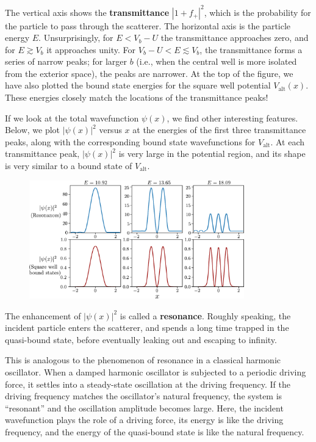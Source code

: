 \documentclass[pra,12pt]{revtex4}
\begin{document}
The vertical axis shows the \textbf{transmittance} $|1+f_+|^2$, which
is the probability for the particle to pass through the scatterer.
The horizontal axis is the particle energy $E$.  Unsurprisingly, for
$E < V_b-U$ the transmittance approaches zero, and for $E \gtrsim V_b$
it approaches unity.  For $V_b-U < E \lesssim V_b$, the transmittance
forms a series of narrow peaks; for larger $b$ (i.e., when the central
well is more isolated from the exterior space), the peaks are
narrower.  At the top of the figure, we have also plotted the bound
state energies for the square well potential $V_{\mathrm{alt}}(x)$.
These energies closely match the locations of the transmittance peaks!

If we look at the total wavefunction $\psi(x)$, we find other
interesting features.  Below, we plot $|\psi(x)|^2$ versus $x$ at the
energies of the first three transmittance peaks, along with the
corresponding bound state wavefunctions for $V_{\mathrm{alt}}$.  At
each transmittance peak, $|\psi(x)|^2$ is very large in the potential
region, and its shape is very similar to a bound state of
$V_{\mathrm{alt}}$.

\begin{figure}[h]
  \centering\includegraphics[width=0.83\textwidth]{resonancewavefunctions}
\end{figure}

\noindent
The enhancement of $|\psi(x)|^2$ is called a \textbf{resonance}.
Roughly speaking, the incident particle enters the scatterer, and
spends a long time trapped in the quasi-bound state, before eventually
leaking out and escaping to infinity.

This is analogous to the phenomenon of resonance in a classical
harmonic oscillator.  When a damped harmonic oscillator is subjected
to a periodic driving force, it settles into a steady-state
oscillation at the driving frequency.  If the driving frequency
matches the oscillator's natural frequency, the system is ``resonant''
and the oscillation amplitude becomes large.  Here, the incident
wavefunction plays the role of a driving force, its energy is like the
driving frequency, and the energy of the quasi-bound state is like the
natural frequency.
\end{document}

